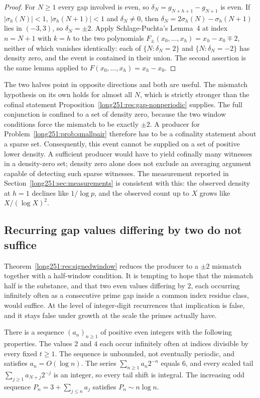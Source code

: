 \documentclass[11pt]{article}
\begin{document}
\begin{proof}
For $N\ge1$ every gap involved is even, so $\delta_N=g_{N+h+1}-g_{N+1}$ is
even.  If $|\sigma_h(N)|<1$, $|\sigma_h(N+1)|<1$ and $\delta_N\ne0$, then
$\delta_N=2\sigma_h(N)-\sigma_h(N+1)$ lies in $(-3,3)$, so $\delta_N=\pm2$.
Apply Schlage-Puchta's Lemma~4 at index $n=N+1$ with $k=h$ to the two
polynomials $F_\pm(x_0,\ldots,x_h)=x_h-x_0\mp2$, neither of which vanishes
identically: each of $\{N:\delta_N=2\}$ and $\{N:\delta_N=-2\}$ has density
zero, and the event is contained in their union.  The second assertion is the
same lemma applied to $F(x_0,\ldots,x_h)=x_h-x_0$.
\end{proof}

The two halves point in opposite directions and both are useful.  The mismatch
hypothesis on its own holds for almost all $N$, which is strictly stronger than
the cofinal statement Proposition~\ref{long251:res:gap-nonperiodic} supplies.  The full
conjunction is confined to a set of density zero, because the two window
conditions force the mismatch to be exactly $\pm2$.  A producer for
Problem~\ref{long251:prob:smallpair} therefore has to be a cofinality statement about
a sparse set.  Consequently, this event cannot be supplied on a set of positive
lower density.  A sufficient producer would have to yield cofinally many
witnesses in a density-zero set; density zero alone does not exclude an
averaging argument capable of detecting such sparse witnesses.  The measurement reported
in Section~\ref{long251:sec:measurements} is consistent with this: the observed density
at $h=1$ declines like $1/\log p$, and the observed count up to $X$ grows like
$X/(\log X)^2$.

\subsection{Recurring gap values differing by two do not suffice}

Theorem~\ref{long251:res:signedwindow} reduces the producer to a $\pm2$ mismatch
together with a half-window condition.  It is tempting to hope that the
mismatch half is the substance, and that two even values differing by $2$, each
occurring infinitely often as a consecutive prime gap inside a common index
residue class, would suffice.  At the level of integer-digit recurrences that
implication is false, and it stays false under growth at the scale the primes
actually have.

\begin{theorem}\label{long251:res:polignacfail}
There is a sequence $(a_n)_{n\ge1}$ of positive even integers with the
following properties.  The values $2$ and $4$ each occur infinitely often at
indices divisible by every fixed $t\ge1$.  The sequence is unbounded, not
eventually periodic, and satisfies $a_n=O(\log n)$.  The series
$\sum_{n\ge1}a_n2^{-n}$ equals $6$, and every scaled tail
$\sum_{j\ge1}a_{N+j}2^{-j}$ is an integer, so every tail shift is integral.
The increasing odd sequence $P_n=3+\sum_{j\le n}a_j$ satisfies
$P_n\sim n\log n$.
\end{theorem}
\end{document}
